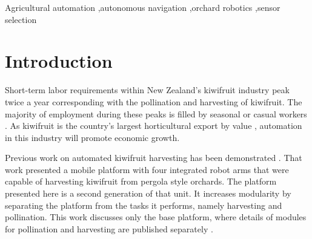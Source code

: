 \documentclass[preprint,authoryear,12pt]{elsarticle}
\begin{document}
\begin{frontmatter}
\begin{abstract}
    The selection of sensors best suited for autonomous navigation in this environment is discussed and presented with in-orchard test results.
    Details of the platform's software and hardware architecture are also discussed.
    The series-hybrid platform we present can reliably self-navigate through a test orchard unassisted and is capable of carrying a \SI{1000}{\kilo\gram} payload.
\end{abstract}

\begin{keyword}

    Agricultural automation \sep autonomous navigation \sep orchard robotics \sep sensor selection
\end{keyword}

\end{frontmatter}


\section{Introduction}
\label{sect:intro}
    Short-term labor requirements within New Zealand's kiwifruit industry peak twice a year corresponding with the pollination and harvesting of kiwifruit.
    The majority of employment during these peaks is filled by seasonal or casual workers \citep{Timmins2009}.
    As kiwifruit is the country's largest horticultural export by value \citep{StatisticsNewZealand2015}, automation in this industry will promote economic growth.

    Previous work on automated kiwifruit harvesting has been demonstrated \citep{Scarfe2012}.
    That work presented a mobile platform with four integrated robot arms that were capable of harvesting kiwifruit from pergola style orchards.
    The platform presented here is a second generation of that unit.
    It increases modularity by separating the platform from the tasks it performs, namely harvesting and pollination.
    This work discusses only the base platform, where details of modules for pollination and harvesting are published separately \citep{williams2017,Seabright2017}.
\end{document}
